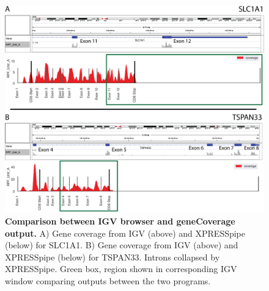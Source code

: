 \documentclass[10pt, oneside]{article}
\begin{document}
\begin{figure}
\centering
  \includegraphics[width=160mm]{figures/xpresspipe_supplement1.png}
  \caption{\textbf{Comparison between IGV browser and geneCoverage output.} A) Gene coverage from IGV (above) and XPRESSpipe (below) for SLC1A1. B) Gene coverage from IGV (above) and XPRESSpipe (below) for TSPAN33. Introns collapsed by XPRESSpipe. Green box, region shown in corresponding IGV window comparing outputs between the two programs.}
  \label{fig:supplement1}
\end{figure}
\end{document}
